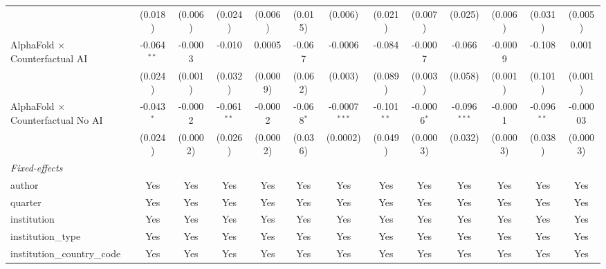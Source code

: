 \begin{tabular}{lcccccccccccc}
                                            & (0.018)       & (0.006)  & (0.024)       & (0.006)  & (0.015)      & (0.006)         & (0.021)       & (0.007)       & (0.025)        & (0.006)      & (0.031)       & (0.005)\\   
   AlphaFold $\times$ Counterfactual AI     & -0.064$^{**}$ & -0.0003  & -0.010        & 0.0005   & -0.067       & -0.0006         & -0.084        & -0.0007       & -0.066         & -0.0009      & -0.108        & 0.001\\   
                                            & (0.024)       & (0.001)  & (0.032)       & (0.0009) & (0.062)      & (0.003)         & (0.089)       & (0.003)       & (0.058)        & (0.001)      & (0.101)       & (0.001)\\   
   AlphaFold $\times$ Counterfactual No AI  & -0.043$^{*}$  & -0.0002  & -0.061$^{**}$ & -0.0002  & -0.068$^{*}$ & -0.0007$^{***}$ & -0.101$^{**}$ & -0.0006$^{*}$ & -0.096$^{***}$ & -0.0001      & -0.096$^{**}$ & -0.00003\\   
                                            & (0.024)       & (0.0002) & (0.026)       & (0.0002) & (0.036)      & (0.0002)        & (0.049)       & (0.0003)      & (0.032)        & (0.0003)     & (0.038)       & (0.0003)\\   
   \midrule
   \emph{Fixed-effects}\\
   author                                   & Yes           & Yes      & Yes           & Yes      & Yes          & Yes             & Yes           & Yes           & Yes            & Yes          & Yes           & Yes\\  
   quarter                                  & Yes           & Yes      & Yes           & Yes      & Yes          & Yes             & Yes           & Yes           & Yes            & Yes          & Yes           & Yes\\  
   institution                              & Yes           & Yes      & Yes           & Yes      & Yes          & Yes             & Yes           & Yes           & Yes            & Yes          & Yes           & Yes\\  
   institution\_type                        & Yes           & Yes      & Yes           & Yes      & Yes          & Yes             & Yes           & Yes           & Yes            & Yes          & Yes           & Yes\\  
   institution\_country\_code               & Yes           & Yes      & Yes           & Yes      & Yes          & Yes             & Yes           & Yes           & Yes            & Yes          & Yes           & Yes\\  

\end{tabular}
